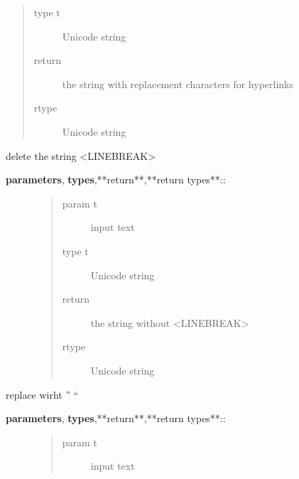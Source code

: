 \documentclass[letterpaper,10pt,english]{sphinxmanual}
\begin{document}
\begin{fulllineitems}
\begin{fulllineitems}
\begin{description}
\begin{quote}
\begin{description}
\item[{type t}] \leavevmode
Unicode string

\item[{return}] \leavevmode
the string with replacement characters for hyperlinks

\item[{rtype}] \leavevmode
Unicode string

\end{description}\end{quote}

\end{description}

\end{fulllineitems}


\begin{fulllineitems}
\label{API:norm.prepro.rewrite.Rewrite.replace_linebreaks}
delete the string \textless{}LINEBREAK\textgreater{}
\begin{description}
\item[{\textbf{parameters}, \textbf{types},**return**,**return types**::}] \leavevmode\begin{quote}\begin{description}
\item[{param t}] \leavevmode
input text

\item[{type t}] \leavevmode
Unicode string

\item[{return}] \leavevmode
the string without \textless{}LINEBREAK\textgreater{}

\item[{rtype}] \leavevmode
Unicode string

\end{description}\end{quote}

\end{description}

\end{fulllineitems}


\begin{fulllineitems}
\label{API:norm.prepro.rewrite.Rewrite.replace_pipe}
replace \textbar{} wirht '' ``
\begin{description}
\item[{\textbf{parameters}, \textbf{types},**return**,**return types**::}] \leavevmode\begin{quote}\begin{description}
\item[{param t}] \leavevmode
input text


\end{description}
\end{quote}
\end{description}
\end{fulllineitems}
\end{fulllineitems}
\end{document}
